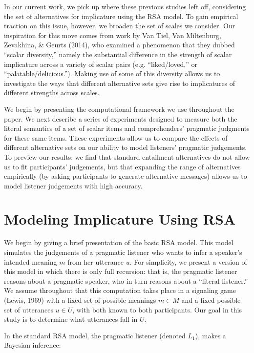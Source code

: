 \documentclass[10pt, letterpaper]{article}
\begin{document}
In our current work, we pick up where these previous studies left off,
considering the set of alternatives for implicature using the RSA model.
To gain empirical traction on this issue, however, we broaden the set of
scales we consider. Our inspiration for this move comes from work by Van
Tiel, Van Miltenburg, Zevakhina, \& Geurts (2014), who examined a
phenomenon that they dubbed ``scalar diversity,'' namely the substantial
difference in the strength of scalar implicature across a variety of
scalar pairs (e.g. ``liked/loved,'' or ``palatable/delicious.''). Making
use of some of this diversity allows us to investigate the ways that
different alternative sets give rise to implicatures of different
strengths across scales.

We begin by presenting the computational framework we use throughout the
paper. We next describe a series of experiments designed to measure both
the literal semantics of a set of scalar items and comprehenders'
pragmatic judgments for these same items. These experiments allow us to
compare the effects of different alternative sets on our ability to
model listeners' pragmatic judgements. To preview our results: we find
that standard entailment alternatives do not allow us to fit
participants' judgements, but that expanding the range of alternatives
empirically (by asking participants to generate alternative messages)
allows us to model listener judgements with high accuracy.

\section{Modeling Implicature Using
RSA}\label{modeling-implicature-using-rsa}

We begin by giving a brief presentation of the basic RSA model. This
model simulates the judgements of a pragmatic listener who wants to
infer a speaker's intended meaning \(m\) from her utterance \(u\). For
simplicity, we present a version of this model in which there is only
full recursion: that is, the pragmatic listener reasons about a
pragmatic speaker, who in turn reasons about a ``literal listener.'' We
assume throughout that this computation takes place in a signaling game
(Lewis, 1969) with a fixed set of possible meanings \(m \in M\) and a
fixed possible set of utterances \(u \in U\), with both known to both
participants. Our goal in this study is to determine what utterances
fall in \(U\).

In the standard RSA model, the pragmatic listener (denoted \(L_1\)),
makes a Bayesian inference:
\end{document}
